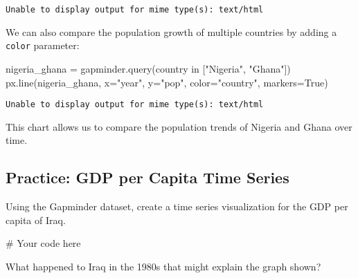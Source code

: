 \documentclass[
  letterpaper,
  DIV=11,
  numbers=noendperiod]{scrreprt}
\newenvironment{Shaded}{\begin{snugshade}}{\end{snugshade}}
\newcommand{\CommentTok}[1]{\textcolor[rgb]{0.37,0.37,0.37}{#1}}
\newcommand{\NormalTok}[1]{\textcolor[rgb]{0.00,0.23,0.31}{#1}}
\newcommand{\OperatorTok}[1]{\textcolor[rgb]{0.37,0.37,0.37}{#1}}
\newcommand{\StringTok}[1]{\textcolor[rgb]{0.13,0.47,0.30}{#1}}
\newcommand{\VariableTok}[1]{\textcolor[rgb]{0.07,0.07,0.07}{#1}}
\begin{document}
\begin{verbatim}
Unable to display output for mime type(s): text/html
\end{verbatim}

We can also compare the population growth of multiple countries by
adding a \texttt{color} parameter:

\begin{Shaded}
\begin{Highlighting}[]
\NormalTok{nigeria\_ghana }\OperatorTok{=}\NormalTok{ gapminder.query(}\StringTok{\textquotesingle{}country in ["Nigeria", "Ghana"]\textquotesingle{}}\NormalTok{)}
\NormalTok{px.line(nigeria\_ghana, x}\OperatorTok{=}\StringTok{"year"}\NormalTok{, y}\OperatorTok{=}\StringTok{"pop"}\NormalTok{, color}\OperatorTok{=}\StringTok{"country"}\NormalTok{, markers}\OperatorTok{=}\VariableTok{True}\NormalTok{)}
\end{Highlighting}
\end{Shaded}

\begin{verbatim}
Unable to display output for mime type(s): text/html
\end{verbatim}

This chart allows us to compare the population trends of Nigeria and
Ghana over time.

\begin{tcolorbox}[enhanced jigsaw, colframe=quarto-callout-tip-color-frame, opacityback=0, titlerule=0mm, bottomrule=.15mm, breakable, leftrule=.75mm, colbacktitle=quarto-callout-tip-color!10!white, title=\textcolor{quarto-callout-tip-color}{\faLightbulb}\hspace{0.5em}{Practice}, rightrule=.15mm, coltitle=black, opacitybacktitle=0.6, colback=white, left=2mm, arc=.35mm, toptitle=1mm, bottomtitle=1mm, toprule=.15mm]

\subsection{Practice: GDP per Capita Time
Series}\label{practice-gdp-per-capita-time-series}

Using the Gapminder dataset, create a time series visualization for the
GDP per capita of Iraq.

\begin{Shaded}
\begin{Highlighting}[]
\CommentTok{\# Your code here}
\end{Highlighting}
\end{Shaded}

What happened to Iraq in the 1980s that might explain the graph shown?

\end{tcolorbox}
\end{document}
